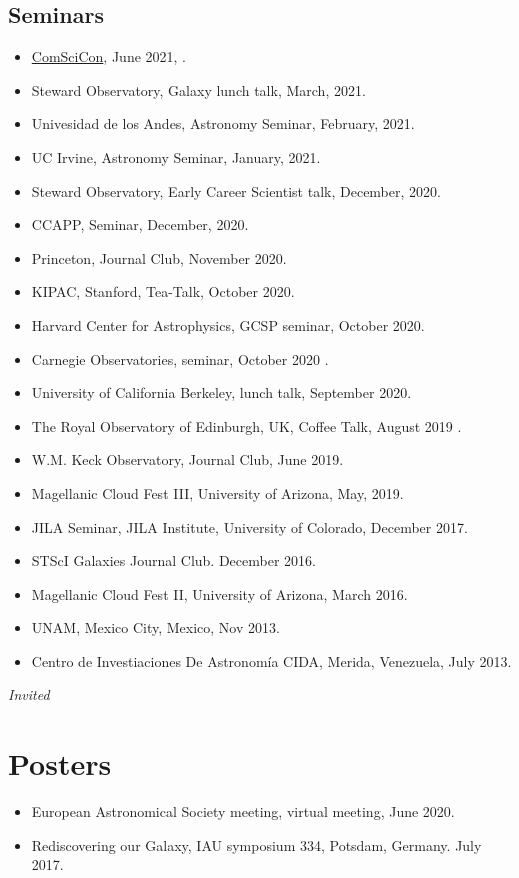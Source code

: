 \documentclass[UTF8]{article}
\begin{document}
\subsection*{Seminars}
\begin{itemize}
  \setlength\itemsep{0.0em}
  \renewcommand\labelitemi{$\cdot$}

\item \href{https://comscicon.com/comscicon-en-espa%C3%B1ol-2021}{ComSciCon}, June 2021, \dag. 
\item Steward Observatory, Galaxy lunch talk, March, 2021.
\item Univesidad de los Andes, Astronomy Seminar, February, 2021. 
\item UC Irvine, Astronomy Seminar, January, 2021. \dag
\item Steward Observatory, Early Career Scientist talk, December, 2020. \dag
\item CCAPP, Seminar, December, 2020. \dag
\item Princeton, Journal Club, November 2020. \dag
\item KIPAC, Stanford, Tea-Talk, October 2020.
\item Harvard Center for Astrophysics, GCSP seminar, October 2020.
\item Carnegie Observatories, seminar, October 2020 \dag.
\item University of California Berkeley, lunch talk, September 2020. 
\item The Royal Observatory of Edinburgh, UK, Coffee Talk, August 2019 \dag.
\item W.M. Keck Observatory, Journal Club, June 2019.
\item Magellanic Cloud Fest III, University of Arizona, May, 2019.
\item JILA Seminar, JILA Institute, University of Colorado, December 2017.
\item STScI Galaxies Journal Club. December 2016.
\item Magellanic Cloud Fest II, University of Arizona, March 2016.
\item UNAM, Mexico City, Mexico, Nov 2013. 
\item Centro de Investiaciones De Astronom\'ia CIDA, Merida, Venezuela, July 2013.
\end{itemize}
\indent \dag \textit{Invited}

\section*{Posters}
\begin{itemize}
\setlength\itemsep{0.0em}
\renewcommand\labelitemi{$\cdot$}
  \item European Astronomical Society meeting, virtual meeting, June 2020.
  \item Rediscovering our Galaxy, IAU symposium 334, Potsdam, Germany. July 2017.
\end{itemize}
\end{document}

